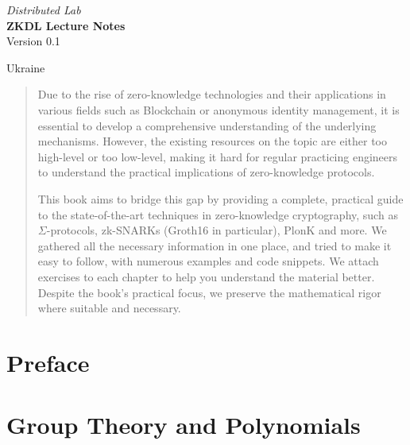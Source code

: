 \documentclass{zkdl-template-105x135-nohead}
\def\maketitle{
    \begin{center}
        {\Large\sffamily \emph{Distributed Lab}} \\ \vspace{30mm}
        {\huge\sffamily\bfseries ZKDL Lecture Notes} \\ \vspace{5mm}
        {Version 0.1} \\ \vspace{10mm}
    \end{center}
    
    \vfill

    \begin{center}
        {Ukraine} \\ \vspace{2mm}
        {\sffamily \the\year}
    \end{center}

    \thispagestyle{empty}
    \pagebreak
}
\begin{document}
    \maketitle

    \pagecolor{white}
    
    \begin{abstract}
        \fontsize{7}{8}\selectfont
        Due to the rise of zero-knowledge technologies and their applications in
        various fields such as Blockchain or anonymous identity management, it is
        essential to develop a comprehensive understanding of the underlying
        mechanisms. However, the existing resources on the topic are either too
        high-level or too low-level, making it hard for regular practicing engineers
        to understand the practical implications of zero-knowledge protocols.
    
        This book aims to bridge this gap by providing a complete, practical guide
        to the state-of-the-art techniques in zero-knowledge cryptography, such as
        $\Sigma$-protocols, zk-SNARKs (Groth16 in particular), PlonK and more. We
        gathered all the necessary information in one place, and tried to make it
        easy to follow, with numerous examples and code snippets. We attach
        exercises to each chapter to help you understand the material better.
        Despite the book's practical focus, we preserve the mathematical rigor where
        suitable and necessary.
    \end{abstract}
    
    \thispagestyle{empty}
    \newpage

    \pagestyle{fancy}
    \pagecolor{white}

    \tableofcontents

    \pagebreak


    \section*{Preface}

    

    \section{Group Theory and Polynomials} \label{section:math-crypto-1}

    
\end{document}
